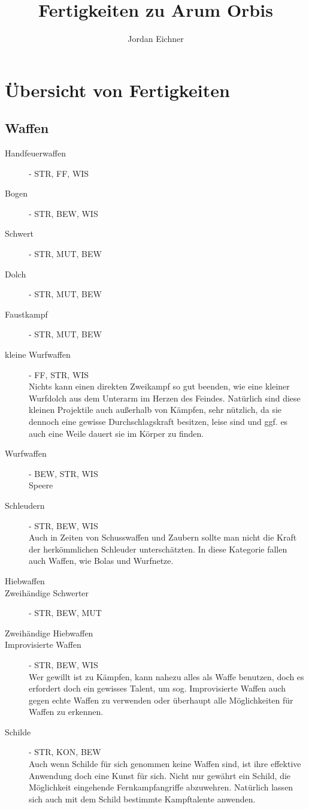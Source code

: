 \documentclass[a4paper,12pt,oneside]{book}
\author{Jordan Eichner}
\title{Fertigkeiten zu Arum Orbis}
\date{}
\begin{document}
\maketitle
\tableofcontents
\section{Übersicht von Fertigkeiten}
\subsection{Waffen}
\begin{description}
\item[Handfeuerwaffen]- STR, FF, WIS
\item[Bogen]- STR, BEW, WIS
\item[Schwert]- STR, MUT, BEW
\item[Dolch]- STR, MUT, BEW
\item[Faustkampf]- STR, MUT, BEW
\item[kleine Wurfwaffen]- FF, STR, WIS
\\Nichts kann einen direkten Zweikampf so gut beenden, wie eine kleiner Wurfdolch aus dem Unterarm im Herzen des Feindes. Natürlich sind diese kleinen Projektile auch außerhalb von Kämpfen, sehr nützlich, da sie dennoch eine gewisse Durchschlagskraft besitzen, leise sind und ggf. es auch eine Weile dauert sie im Körper zu finden.
\item[Wurfwaffen]- BEW, STR, WIS
\\Speere
\item[Schleudern]- STR, BEW, WIS
\\Auch in Zeiten von Schusswaffen und Zaubern sollte man nicht die Kraft der herkömmlichen Schleuder unterschätzten. In diese Kategorie fallen auch Waffen, wie Bolas und Wurfnetze.
\item[Hiebwaffen]
\item[Zweihändige Schwerter]- STR, BEW, MUT
\item[Zweihändige Hiebwaffen]
\item[Improvisierte Waffen] - STR, BEW, WIS
\\Wer gewillt ist zu Kämpfen, kann nahezu alles als Waffe benutzen, doch es erfordert doch ein gewisses Talent, um sog. Improvisierte Waffen auch gegen echte Waffen zu verwenden oder überhaupt alle Möglichkeiten für Waffen zu erkennen.
\item[Schilde] - STR, KON, BEW
\\Auch wenn Schilde für sich genommen keine Waffen sind, ist ihre effektive Anwendung doch eine Kunst für sich. Nicht nur gewährt ein Schild, die Möglichkeit eingehende Fernkampfangriffe abzuwehren. Natürlich lassen sich auch mit dem Schild bestimmte Kampftalente anwenden.

\end{description}
\end{document}
